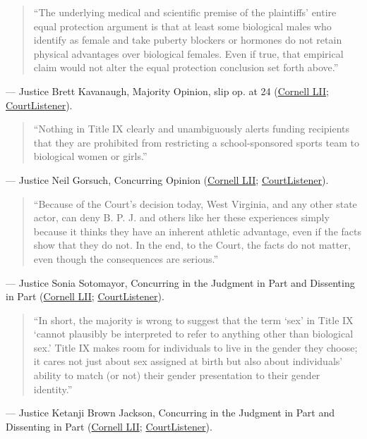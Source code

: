 \documentclass[12pt]{article}
\begin{document}
\begin{quote}
``The underlying medical and scientific premise of the plaintiffs' entire equal protection argument is that at least some biological males who identify as female and take puberty blockers or hormones do not retain physical advantages over biological females. Even if true, that empirical claim would not alter the equal protection conclusion set forth above.''
\end{quote}
--- Justice Brett Kavanaugh, Majority Opinion, slip op. at 24 (\href{https://www.law.cornell.edu/supremecourt/text/24-43}{Cornell LII}; \href{https://www.courtlistener.com/opinion/10882186/west-virginia-v-b-p-j/}{CourtListener}).

\begin{quote}
``Nothing in Title IX clearly and unambiguously alerts funding recipients that they are prohibited from restricting a school-sponsored sports team to biological women or girls.''
\end{quote}
--- Justice Neil Gorsuch, Concurring Opinion (\href{https://www.law.cornell.edu/supremecourt/text/24-43}{Cornell LII}; \href{https://www.courtlistener.com/opinion/10882186/west-virginia-v-b-p-j/}{CourtListener}).

\begin{quote}
``Because of the Court's decision today, West Virginia, and any other state actor, can deny B. P. J. and others like her these experiences simply because it thinks they have an inherent athletic advantage, even if the facts show that they do not. In the end, to the Court, the facts do not matter, even though the consequences are serious.''
\end{quote}
--- Justice Sonia Sotomayor, Concurring in the Judgment in Part and Dissenting in Part (\href{https://www.law.cornell.edu/supremecourt/text/24-43}{Cornell LII}; \href{https://www.courtlistener.com/opinion/10882186/west-virginia-v-b-p-j/}{CourtListener}).

\begin{quote}
``In short, the majority is wrong to suggest that the term `sex' in Title IX `cannot plausibly be interpreted to refer to anything other than biological sex.' Title IX makes room for individuals to live in the gender they choose; it cares not just about sex assigned at birth but also about individuals' ability to match (or not) their gender presentation to their gender identity.''
\end{quote}
--- Justice Ketanji Brown Jackson, Concurring in the Judgment in Part and Dissenting in Part (\href{https://www.law.cornell.edu/supremecourt/text/24-43}{Cornell LII}; \href{https://www.courtlistener.com/opinion/10882186/west-virginia-v-b-p-j/}{CourtListener}).
\end{document}
